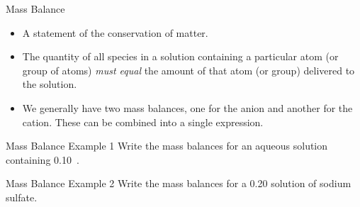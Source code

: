\documentclass[notes=onlyslideswithnotes,notes=hide]{beamer}
\begin{document}
\begin{frame}{Mass Balance}
	\begin{itemize}
		\item A statement of the conservation of matter.
		\item The quantity of all species in a solution containing a
			particular atom (or group of atoms) \emph{must equal}
			the amount of that atom (or group) delivered to the
			solution.
		\item We generally have two mass balances, one for the anion and
			another for the cation. These can be combined into a
			single expression.
	\end{itemize}
\end{frame}


\begin{frame}[t]{Mass Balance Example 1}
	Write the mass balances for an aqueous solution containing
	\SI{0.10}{\formal}~.


\end{frame}

\begin{frame}[t]{Mass Balance Example 2}
	Write the mass balances for a \SI{0.20}{\formal} solution of sodium
	sulfate.


\end{frame}
	
\end{document}
